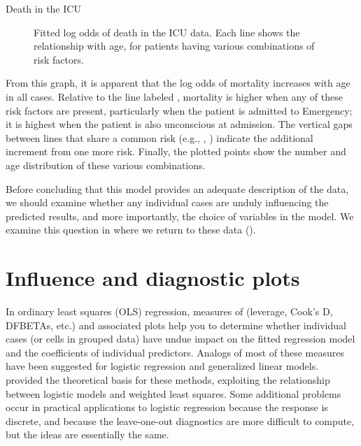 \documentclass[11pt]{book}\usepackage[]{graphicx}\usepackage[]{color}
\newenvironment{knitrout}{}{} %
\renewenvironment{knitrout}{\small\renewcommand{\baselinestretch}{.85}}{} %
\begin{document}
\begin{Example}[icu1]{Death in the ICU}
\begin{knitrout}
\begin{figure}[!htbp]
\caption[Fitted log odds of death in the ICU data]{Fitted log odds of death in the ICU data. Each line shows the relationship with age, for patients having various combinations of risk factors.\label{fig:icu1-fit-plot}}
\end{figure}


\end{knitrout}
From this graph, it is apparent that the log odds of mortality increases with
age in all cases. Relative to the line labeled ,
mortality is higher when any of these risk factors are present, particularly
when the patient is admitted to Emergency; it is highest when the
patient is also unconscious at admission.  The vertical gaps between lines
that share a common risk (e.g., , )
indicate the additional increment from one more risk.
Finally, the plotted points show the number and age distribution of
these various combinations.

Before concluding that this model provides an adequate description of the
data, we should examine whether any individual cases are unduly influencing
the predicted results, and more importantly, the choice of variables in
the model.  We examine this question in 
where we return to these data ().



\end{Example}


\section{Influence and diagnostic plots}\label{sec:logist-infl}

In ordinary least squares (OLS) regression, measures of 
(leverage, Cook's D, DFBETAs, etc.) and associated plots
help you to determine whether
individual cases (or cells in grouped data)
have undue impact on the fitted regression model and
the coefficients of individual predictors.
Analogs of most of these
measures have been suggested for logistic regression
and generalized linear models.
\citet{Pregibon:81} provided the theoretical basis for these methods,
exploiting the relationship between logistic models and
weighted least squares.  Some
additional problems occur in practical applications to
logistic regression because the response
is discrete, and because the leave-one-out diagnostics are more
difficult to compute, but the ideas are essentially the same.
\end{document}
